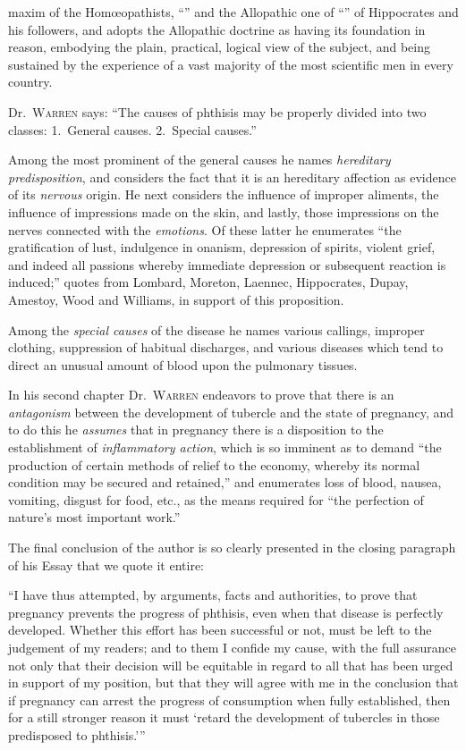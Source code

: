 maxim of the Homœopathists, ``'' and the
Allopathic one of ``'' of Hippocrates
and his followers, and adopts the Allopathic doctrine as having its
foundation in reason, embodying the plain, practical, logical view of
the subject, and being sustained by the experience of a vast majority of
the most scientific men in every country.

Dr.~\textsc{Warren} says: ``The causes of phthisis may be properly divided
into two classes:   1.~General causes. 2.~Special causes.''

Among the most prominent of the general causes he names \emph{hereditary
predisposition}, and considers the fact that it is an hereditary
affection as  evidence of its \emph{nervous} origin. He next considers
the influence of improper aliments, the influence of impressions
made on the skin, and lastly, those impressions on the nerves connected
with the \emph{emotions}. Of these latter he enumerates ``the gratification
of lust, indulgence in onanism, depression of spirits, violent grief, and
indeed all passions whereby immediate depression or subsequent reaction
is induced;'' quotes from Lombard, Moreton, Laennec, Hippocrates,
Dupay, Amestoy, Wood and Williams, in support of this proposition.

Among the \emph{special causes} of the disease he names various callings,
improper clothing, suppression of habitual discharges, and various diseases
which tend to direct an unusual amount of blood upon the pulmonary tissues.

In his second chapter Dr.~\textsc{Warren} endeavors to prove that there is
an \emph{antagonism} between the development of tubercle and the state of
pregnancy, and to do this he \emph{assumes} that in pregnancy there is a disposition
to the establishment of \emph{inflammatory action}, which is so imminent
as to demand ``the production of certain methods of relief to the
economy, whereby its normal condition may be secured and retained,''
and enumerates loss of blood, nausea, vomiting, disgust for food, etc., as
the means required for ``the perfection of nature's most important work.''

The final conclusion of the author is so clearly presented in the closing
paragraph of his Essay that we quote it entire:

``I have thus attempted, by arguments, facts and authorities, to
prove that pregnancy prevents the progress of phthisis, even when that
disease is perfectly developed. Whether this effort has been successful
or not, must be left to the judgement of my readers; and to them I
confide my cause, with the full assurance not only that their decision
will be equitable in regard to all that has been urged in support of my
position, but that they will agree with me in the conclusion that if
pregnancy can arrest the progress of consumption when fully established,
then for a still stronger reason it must `retard the development of
tubercles in those predisposed to phthisis.'\thinspace{}'' \endinput

